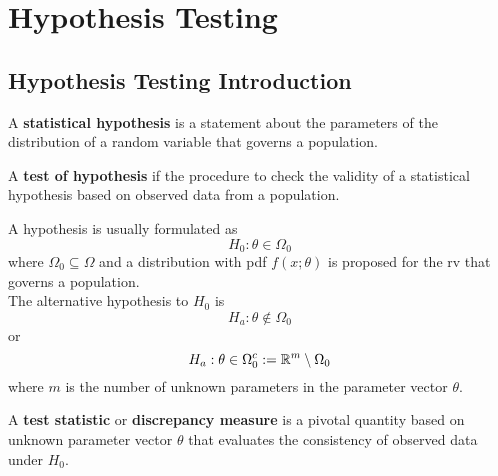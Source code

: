 \documentclass[11pt,fleqn]{book} %
\begin{document}


\chapter{Hypothesis Testing}


\section{Hypothesis Testing Introduction}

\begin{definition} \label{def:711}
A \textbf{statistical hypothesis} is a statement about the parameters of the distribution of a random variable that governs a population.
\end{definition}

\begin{definition} \label{def:712}
A \textbf{test of hypothesis} if the procedure to check the validity of a statistical hypothesis based on observed data from a population.
\end{definition}

\begin{remark} \label{rmk:713}
A hypothesis is usually formulated as
\[
H_0: \theta\in\Omega_0
\]
where \(\Omega_0 \subseteq \Omega\) and a distribution with pdf \(f(x; \theta)\) is proposed for the rv that governs a population. \\
\indent The alternative hypothesis to \(H_0\) is
\[
H_a: \theta \notin \Omega_0
\]
or
\[
H_a: \theta \in \Omega_0^c := \mathbb{R}^m \setminus \Omega_0
\]
where \(m\) is the number of unknown parameters in the parameter vector \(\theta\).
\end{remark}

\begin{definition} \label{def:714}
A \textbf{test statistic} or \textbf{discrepancy measure} is a pivotal quantity based on unknown parameter vector \(\theta\) that evaluates the consistency of observed data under \(H_0\).
\end{definition}
\end{document}

